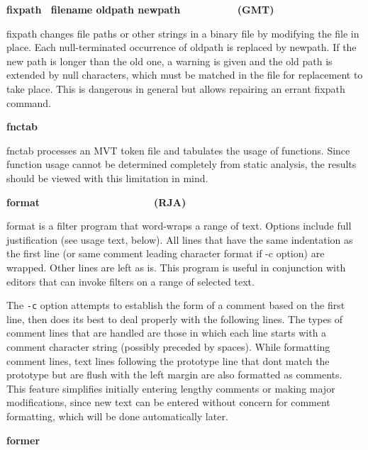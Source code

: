{



{\sffamily\bfseries
fixpath \ \textrm{\textmd{filename oldpath
newpath\ \ \ \ \ \ \ \ \ \ }}(GMT)}

\textsf{fixpath} changes file paths or other strings in a binary file by
modifying the file in place. Each null-terminated occurrence of
\textsf{oldpath} is replaced by \textsf{newpath}. If the new path is
longer than the old one, a warning is given and the old path is
extended by null characters, which must be matched in the file for
replacement to take place. This is dangerous in general but allows
repairing an errant fixpath command. 

{\sffamily\bfseries
fnctab\ \ \ \ \ \ \ \ \ \ \ \ \ \ \ \ \ \ \ \ }

\textsf{fnctab} processes an MVT token file and tabulates the usage of
functions. Since function usage cannot be determined completely from
static analysis, the results should be viewed with this limitation in
mind.

{\sffamily\bfseries
format\ \ \ \ \ \ \ \ \ \ \ \ \ \ \ \ \ \ \ \ (RJA)}

\textsf{format} is a filter program that word-wraps a range
of text. Options include full justification (see usage text, below).
All lines that have the same indentation as the first line (or same
comment leading character format if -c option) are wrapped. Other lines
are left as is. This program is useful in conjunction with editors that
can invoke filters on a range of selected text.

The \texttt{{}-c} option attempts to establish the form of a comment
based on the first line, then does its best to deal properly with the
following lines. The types of comment lines that are handled are those
in which each line starts with a {\textquotedbl}comment{\textquotedbl}
character string (possibly preceded by spaces). While formatting
comment lines, text lines following the prototype line
that don{\textquotesingle}t match the prototype but are flush with the
left margin are also formatted as comments. This feature simplifies
initially entering lengthy comments or making major modifications,
since new text can be entered without concern for comment formatting,
which will be done automatically later.

{\sffamily\bfseries
former\ \ \ \ \ \ \ \ \ \ \ \ \ \ \ \ \ \ \ \ }

}
